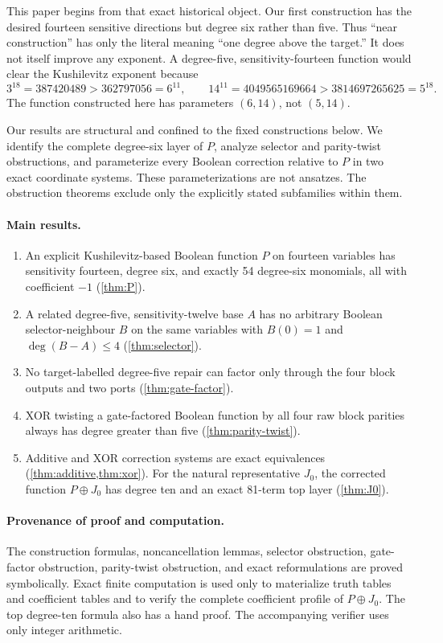 \documentclass[11pt]{article}
\theoremstyle{definition}
\begin{document}
This paper begins from that exact historical object.  Our first construction
has the desired fourteen sensitive directions but degree six rather than five.
Thus ``near construction'' has only the literal meaning ``one degree above the
target.''  It does not itself improve any exponent.  A degree-five,
sensitivity-fourteen function would clear the Kushilevitz exponent because
\[
  3^{18}=387420489>362797056=6^{11},\qquad
  14^{11}=4049565169664>3814697265625=5^{18}.
\]
The function constructed here has parameters \((6,14)\), not \((5,14)\).

Our results are structural and confined to the fixed constructions below.  We
identify the complete degree-six layer of \(P\), analyze selector and
parity-twist obstructions, and parameterize every Boolean correction relative
to \(P\) in two exact coordinate systems.  These parameterizations are not
ansatzes.  The obstruction theorems exclude only the explicitly stated
subfamilies within them.

\paragraph{Main results.}
\begin{enumerate}[label=(\roman*)]
  \item An explicit Kushilevitz-based Boolean function \(P\) on fourteen
  variables has sensitivity fourteen, degree six, and exactly 54 degree-six
  monomials, all with coefficient \(-1\) (\cref{thm:P}).
  \item A related degree-five, sensitivity-twelve base \(A\) has no arbitrary
  Boolean selector-neighbour \(B\) on the same variables with \(B(0)=1\) and
  \(\deg(B-A)\le4\) (\cref{thm:selector}).
  \item No target-labelled degree-five repair can factor only through the four
  block outputs and two ports (\cref{thm:gate-factor}).
  \item XOR twisting a gate-factored Boolean function by all four raw block
  parities always has degree greater than five
  (\cref{thm:parity-twist}).
  \item Additive and XOR correction systems are exact equivalences
  (\cref{thm:additive,thm:xor}).  For the natural representative \(J_0\), the
  corrected function \(P\oplus J_0\) has degree ten and an exact 81-term top
  layer (\cref{thm:J0}).
\end{enumerate}

\paragraph{Provenance of proof and computation.}
The construction formulas, noncancellation lemmas, selector obstruction,
gate-factor obstruction, parity-twist obstruction, and exact reformulations
are proved symbolically.  Exact finite computation is used only to materialize
truth tables and coefficient tables and to verify the complete coefficient
profile of \(P\oplus J_0\).  The top degree-ten formula also has a hand proof.
The accompanying verifier uses only integer arithmetic.
\end{document}

